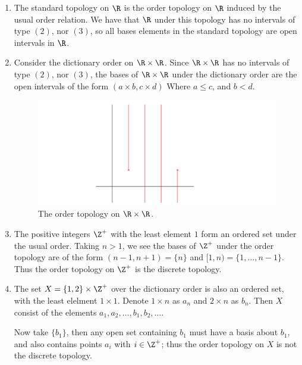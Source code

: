 \begin{example}
    \begin{enumerate}[label=(\arabic*)]
        \item The standard topology on $\R$ is the order topology on $\R$ induced by the 
            usual order relation. We have that $\R$ under this topology has no intervals of 
            type  $(2)$, nor  $(3)$, so all bases elements in the standard topology are 
            open intervals in $\R$.

        \item Consider the dictionary order on  $\R \times \R$. Since  $\R \times \R$ has 
            no intervals of type $(2)$, nor $(3)$, the bases of  $\R \times \R$ under the 
            dictionary order are the open intervals of the form  $(a \times b, c \times d)$ Where 
             $a \leq c$, and  $b<d$.

             \begin{figure}[h]
                 \centering
                 \includegraphics[scale = 0.3]{Figures/Chapter1/orderTopologyOnRxR.png}
                 \caption{The order topology on $\R \times \R$.}
                 \label{fig1.3}
             \end{figure}

         \item The positive integers  $\Z^+$ with the least element  $1$ form an ordered set 
             under the usual order. Taking  $n>1$, we see the bases of  $\Z^+$ under the order 
             topology are of the form  $(n-1,n+1)=\{n\}$ and $[1,n)=\{1, \dots ,n-1\}$. Thus 
             the order topology on  $\Z^+$ is the discrete topology.


         \item The set  $X=\{1,2\} \times \Z^+$ over the dictionary order is also an ordered set, 
             with the least elelment  $1 \times 1$. Denote  $1 \times n$ as  $a_n$ and  $2 \times n$ as 
              $b_n$. Then  $X$ consist of the elements  $a_1,a_2, \dots,b_1,b_2,\dots$.

              Now take $\{b_1\}$, then any open set containing $b_1$ must have a basis 
              about $b_1$, and also contains points $a_i$ with  $i \in \Z^+$; thus the 
              order topology on  $X$ is not the discrete topology.
    \end{enumerate}		
\end{example} 

